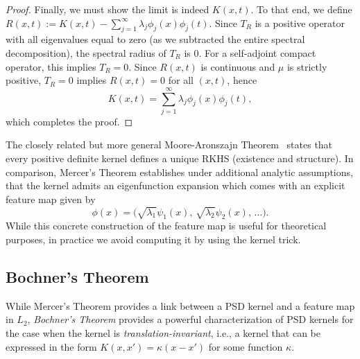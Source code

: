 \begin{proof}
Finally, we must show the limit is indeed $K(x, t)$. To that end, we define $R(x, t) := K(x, t) - \sum_{j=1}^\infty \lambda_j \phi_j(x) \phi_j(t)$.
Since $T_R$ is a positive operator with all eigenvalues equal to zero (as we subtracted the entire spectral decomposition), the spectral radius of $T_R$ is 0. For a self-adjoint compact operator, this implies $T_R = 0$. Since $R(x, t)$ is continuous and $\mu$ is strictly positive, $T_R = 0$ implies $R(x, t) = 0$ for all $(x, t)$, hence
$$K(x, t) = \sum_{j=1}^{\infty} \lambda_j \phi_j(x) \phi_j(t),$$
which completes the proof.

\end{proof}

The closely related but more general Moore-Aronszajn Theorem~\cite{aronszajn1950theory} states that 
every positive definite kernel defines a unique RKHS (existence and structure). In comparison, Mercer's Theorem establishes under additional analytic assumptions, that the kernel admits an eigenfunction expansion which comes with an explicit feature map given by
 $$\phi(x) = \bigl(\sqrt{\lambda_1}\psi_1(x),\,\sqrt{\lambda_2}\psi_2(x),\,\ldots\bigr).$$
While this concrete construction of the feature map is useful for theoretical purposes, in practice we avoid computing it by using the kernel trick.

\subsection{Bochner's Theorem}\label{s:bochner}

While Mercer's Theorem provides a link between a PSD kernel and a feature map in $L_2$, {\em Bochner's Theorem} provides a powerful characterization of PSD kernels for the case when the kernel is {\em translation-invariant}, i.e., a kernel that can be expressed in the form $K(x, x') = \kappa(x - x')$ for some function $\kappa$.



